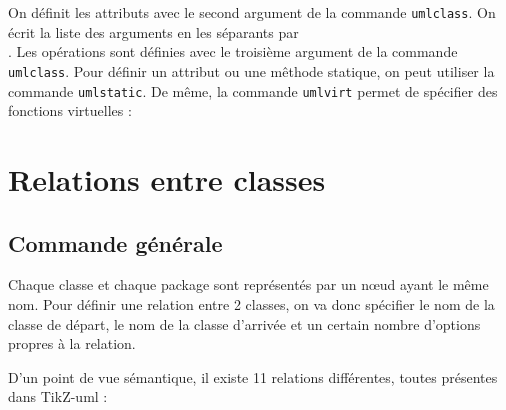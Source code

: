 \documentclass[a4paper,11pt]{report}
\newcommand{\inputTikZ}[1]{%
  }%
\newcommand{\inputTikZ}[1]{%
    \texttt{[image: fig/\#1.pdf]}%
  }%
\newcommand{\tuml}{{\sc TikZ-uml}}
\begin{document}
On définit les attributs avec le second argument de la commande {\tt umlclass}. On écrit la liste des arguments en les séparants par {\tt \\}. Les opérations sont définies avec le troisième argument de la commande {\tt umlclass}. Pour définir un attribut ou une mêthode statique, on peut utiliser la commande {\tt umlstatic}. De même, la commande {\tt umlvirt} permet de spécifier des fonctions virtuelles :

\medskip

\begin{minipage}{0.5\textwidth}

\end{minipage}
\begin{minipage}{0.4\textwidth}
\begin{center}
\inputTikZ{attr-and-op}
\end{center}
\end{minipage}

\section{Relations entre classes}\label{s.rel}

\subsection{Commande générale}\label{ss.relgen}

Chaque classe et chaque package sont représentés par un n\oe{}ud ayant le même nom. Pour définir une relation entre 2 classes, on va donc spécifier le nom de la classe de départ, le nom de la classe d'arrivée et un certain nombre d'options propres à la relation.

\medskip

\begin{minipage}{0.5\textwidth}

\end{minipage}
\begin{minipage}{0.4\textwidth}
\begin{center}
\inputTikZ{relation}
\end{center}
\end{minipage}

D'un point de vue sémantique, il existe 11 relations différentes, toutes présentes dans \tuml{} :
\end{document}
